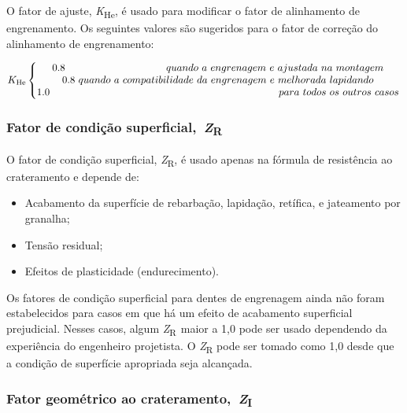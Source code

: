 \documentclass[12pt,a4paper]{article}
\providecommand{\tightlist}{\setlength{\itemsep}{0pt}\setlength{\parskip}{0pt}}%
\begin{document}
O fator de ajuste, \emph{K}\textsubscript{He}, é usado para modificar o
fator de alinhamento de engrenamento. Os seguintes valores são sugeridos
para o fator de correção do alinhamento de engrenamento:

\begin{equation}
K_{\text{He}}\left\{\begin{matrix}
0.8\ \ \ \ \ \  \ \ \ \ \ \ \ \ \ \ \ \ \ \ \ \ \ \ \ \ \ \ \ \ quando\ a\ engrenagem\ e\ ajustada\ na\ montagem\\
0.8\ quando\ a\ compatibilidade\ da\ engrenagem\ e\ melhorada\ lapidando\\
1.0\ \ \ \ \ \ \ \ \ \ \ \ \ \ \ \ \ \ \ \ \ \ \ \ \ \ \ \ \ \ \ \ \ \ \ \ \ \ \ \ \ \ \ \ \ \ \ \ \ \ \ \ \ \ \ \ \ \ \ \ \ \ \ \ \ \ \ \ para\ todos\ os\ outros\ casos\\
\end{matrix}\right.\ \nonumber \\
\end{equation}

\subsubsection*{\texorpdfstring{Fator de condição
superficial,~\emph{Z}\textsubscript{R}}{Fator de condição superficial,~ZR}}

{\label{fator-de-condiuxe7uxe3o-superficial-zr}}

O fator de condição superficial, \emph{Z}\textsubscript{R}, é usado
apenas na fórmula de resistência ao crateramento e depende de:

\begin{itemize}
\tightlist
\item
  Acabamento da superfície de rebarbação, lapidação, retífica, e
  jateamento por granalha;
\item
  Tensão residual;
\item
  Efeitos de plasticidade (endurecimento).
\end{itemize}

Os fatores de condição superficial para dentes de engrenagem ainda não
foram estabelecidos para casos em que há um efeito de acabamento
superficial prejudicial. Nesses casos, algum
\emph{Z}\textsubscript{R~}maior a 1,0 pode ser usado dependendo da
experiência do engenheiro projetista. O \emph{Z}\textsubscript{R} pode
ser tomado como 1,0 desde que a condição de superfície apropriada seja
alcançada.

\subsubsection*{\texorpdfstring{Fator geométrico ao
crateramento,~\emph{Z}\textsubscript{I}}{Fator geométrico ao crateramento,~ZI}}
\end{document}
